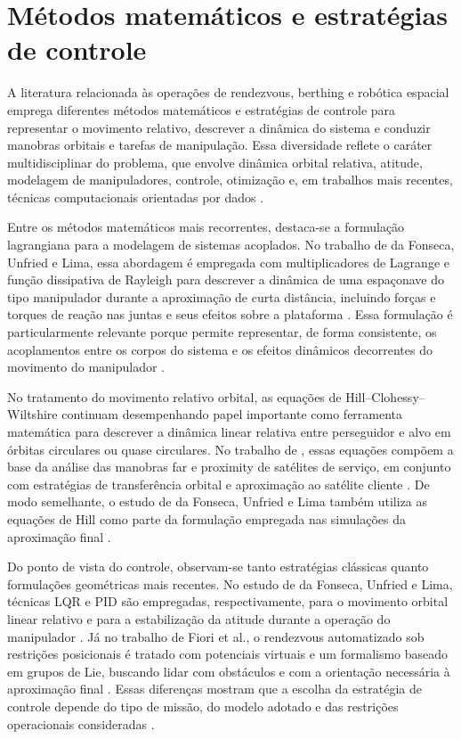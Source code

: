 \section{Métodos matemáticos e estratégias de controle}

A literatura relacionada às operações de rendezvous, berthing e robótica espacial emprega diferentes métodos matemáticos e estratégias de controle para representar o movimento relativo, descrever a dinâmica do sistema e conduzir manobras orbitais e tarefas de manipulação. Essa diversidade reflete o caráter multidisciplinar do problema, que envolve dinâmica orbital relativa, atitude, modelagem de manipuladores, controle, otimização e, em trabalhos mais recentes, técnicas computacionais orientadas por dados \cite{fonseca2016dynamics,arantes2010far,fiori2024modeling,santos2022machine,santos2023physics}.

Entre os métodos matemáticos mais recorrentes, destaca-se a formulação lagrangiana para a modelagem de sistemas acoplados. No trabalho de da Fonseca, Unfried e Lima, essa abordagem é empregada com multiplicadores de Lagrange e função dissipativa de Rayleigh para descrever a dinâmica de uma espaçonave do tipo manipulador durante a aproximação de curta distância, incluindo forças e torques de reação nas juntas e seus efeitos sobre a plataforma \cite{fonseca2016dynamics}. Essa formulação é particularmente relevante porque permite representar, de forma consistente, os acoplamentos entre os corpos do sistema e os efeitos dinâmicos decorrentes do movimento do manipulador \cite{fonseca2016dynamics}.

No tratamento do movimento relativo orbital, as equações de Hill--Clohessy--Wiltshire continuam desempenhando papel importante como ferramenta matemática para descrever a dinâmica linear relativa entre perseguidor e alvo em órbitas circulares ou quase circulares. No trabalho de \cite{arantes2010far}, essas equações compõem a base da análise das manobras far e proximity de satélites de serviço, em conjunto com estratégias de transferência orbital e aproximação ao satélite cliente \cite{arantes2010far}. De modo semelhante, o estudo de da Fonseca, Unfried e Lima também utiliza as equações de Hill como parte da formulação empregada nas simulações da aproximação final \cite{fonseca2016dynamics}.

Do ponto de vista do controle, observam-se tanto estratégias clássicas quanto formulações geométricas mais recentes. No estudo de da Fonseca, Unfried e Lima, técnicas LQR e PID são empregadas, respectivamente, para o movimento orbital linear relativo e para a estabilização da atitude durante a operação do manipulador \cite{fonseca2016dynamics}. Já no trabalho de Fiori et al., o rendezvous automatizado sob restrições posicionais é tratado com potenciais virtuais e um formalismo baseado em grupos de Lie, buscando lidar com obstáculos e com a orientação necessária à aproximação final \cite{fiori2024modeling}. Essas diferenças mostram que a escolha da estratégia de controle depende do tipo de missão, do modelo adotado e das restrições operacionais consideradas \cite{fiori2024modeling,fonseca2016dynamics}.

